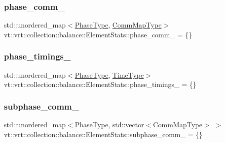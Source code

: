 \subsubsection{\texorpdfstring{phase\+\_\+comm\+\_\+}{phase\_comm\_}}
{\footnotesize\ttfamily std\+::unordered\+\_\+map$<$\hyperlink{namespacevt_a46ce6733d5cdbd735d561b7b4029f6d7}{Phase\+Type}, \hyperlink{namespacevt_1_1vrt_1_1collection_1_1balance_a10860c956804d644db54a16012352728}{Comm\+Map\+Type}$>$ vt\+::vrt\+::collection\+::balance\+::\+Element\+Stats\+::phase\+\_\+comm\+\_\+ = \{\}\hspace{0.3cm}{\ttfamily [protected]}}

\mbox{\label{structvt_1_1vrt_1_1collection_1_1balance_1_1_element_stats_a65d423f8c970d52b83e641d93f0c6918}} 
\subsubsection{\texorpdfstring{phase\+\_\+timings\+\_\+}{phase\_timings\_}}
{\footnotesize\ttfamily std\+::unordered\+\_\+map$<$\hyperlink{namespacevt_a46ce6733d5cdbd735d561b7b4029f6d7}{Phase\+Type}, \hyperlink{namespacevt_a876a9d0cd5a952859c72de8a46881442}{Time\+Type}$>$ vt\+::vrt\+::collection\+::balance\+::\+Element\+Stats\+::phase\+\_\+timings\+\_\+ = \{\}\hspace{0.3cm}{\ttfamily [protected]}}

\mbox{\label{structvt_1_1vrt_1_1collection_1_1balance_1_1_element_stats_aa08f9c01d36183eb705efa2a0596cc2a}} 
\subsubsection{\texorpdfstring{subphase\+\_\+comm\+\_\+}{subphase\_comm\_}}
{\footnotesize\ttfamily std\+::unordered\+\_\+map$<$\hyperlink{namespacevt_a46ce6733d5cdbd735d561b7b4029f6d7}{Phase\+Type}, std\+::vector$<$\hyperlink{namespacevt_1_1vrt_1_1collection_1_1balance_a10860c956804d644db54a16012352728}{Comm\+Map\+Type}$>$ $>$ vt\+::vrt\+::collection\+::balance\+::\+Element\+Stats\+::subphase\+\_\+comm\+\_\+ = \{\}\hspace{0.3cm}{\ttfamily [protected]}}

